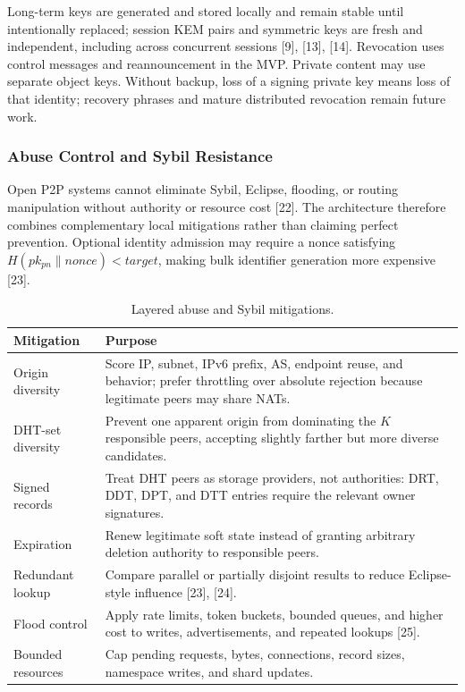 \documentclass[12pt,a4paper]{article}
\begin{document}
Long-term keys are generated and stored locally and remain stable until intentionally replaced; session KEM pairs and symmetric keys are fresh and independent, including across concurrent sessions [9], [13], [14]. Revocation uses control messages and reannouncement in the MVP. Private content may use separate object keys. Without backup, loss of a signing private key means loss of that identity; recovery phrases and mature distributed revocation remain future work.

\subsubsection{Abuse Control and Sybil Resistance}

Open P2P systems cannot eliminate Sybil, Eclipse, flooding, or routing manipulation without authority or resource cost [22]. The architecture therefore combines complementary local mitigations rather than claiming perfect prevention. Optional identity admission may require a nonce satisfying $H(pk_{pn} \parallel nonce) < target$, making bulk identifier generation more expensive [23].

\begin{table}[H]
\centering
\caption{Layered abuse and Sybil mitigations.}
\label{tab:abuse-mitigations}
\begin{tabularx}{\textwidth}{L{0.25\textwidth} Y}
\toprule
\textbf{Mitigation} & \textbf{Purpose} \\
\midrule
Origin diversity & Score IP, subnet, IPv6 prefix, AS, endpoint reuse, and behavior; prefer throttling over absolute rejection because legitimate peers may share NATs. \\
DHT-set diversity & Prevent one apparent origin from dominating the $K$ responsible peers, accepting slightly farther but more diverse candidates. \\
Signed records & Treat DHT peers as storage providers, not authorities: DRT, DDT, DPT, and DTT entries require the relevant owner signatures. \\
Expiration & Renew legitimate soft state instead of granting arbitrary deletion authority to responsible peers. \\
Redundant lookup & Compare parallel or partially disjoint results to reduce Eclipse-style influence [23], [24]. \\
Flood control & Apply rate limits, token buckets, bounded queues, and higher cost to writes, advertisements, and repeated lookups [25]. \\
Bounded resources & Cap pending requests, bytes, connections, record sizes, namespace writes, and shard updates. \\
\bottomrule
\end{tabularx}
\end{table}
\end{document}
